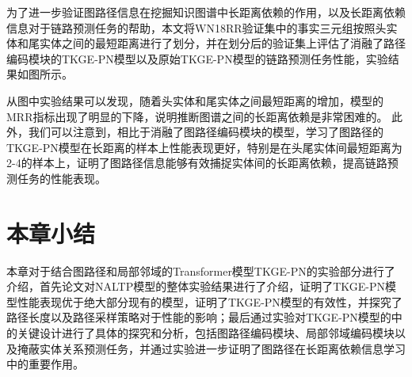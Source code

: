 为了进一步验证图路径信息在挖掘知识图谱中长距离依赖的作用，以及长距离依赖信息对于链路预测任务的帮助，本文将WN18RR验证集中的事实三元组按照头实体和尾实体之间的最短距离进行了划分，并在划分后的验证集上评估了消融了路径编码模块的TKGE-PN模型以及原始TKGE-PN模型的链路预测任务性能，实验结果如图所示。

从图中实验结果可以发现，随着头实体和尾实体之间最短距离的增加，模型的MRR指标出现了明显的下降，说明推断图谱之间的长距离依赖是非常困难的。 此外，我们可以注意到，相比于消融了图路径编码模块的模型，学习了图路径的TKGE-PN模型在长距离的样本上性能表现更好，特别是在头尾实体间最短距离为2-4的样本上，证明了图路径信息能够有效捕捉实体间的长距离依赖，提高链路预测任务的性能表现。

\section{本章小结}

本章对于结合图路径和局部邻域的Transformer模型TKGE-PN的实验部分进行了介绍，首先论文对NALTP模型的整体实验结果进行了介绍，证明了TKGE-PN模型性能表现优于绝大部分现有的模型，证明了TKGE-PN模型的有效性，并探究了路径长度以及路径采样策略对于性能的影响；最后通过实验对TKGE-PN模型的中的关键设计进行了具体的探究和分析，包括图路径编码模块、局部邻域编码模块以及掩蔽实体关系预测任务，并通过实验进一步证明了图路径在长距离依赖信息学习中的重要作用。